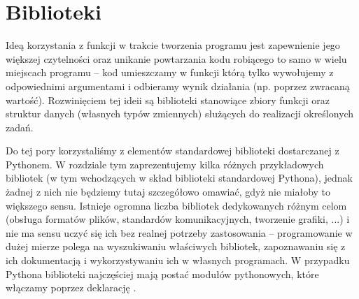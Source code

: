 % 
% 
% 
% 

\section{Biblioteki}

Ideą korzystania z funkcji w trakcie tworzenia programu jest zapewnienie jego większej czytelności oraz unikanie powtarzania kodu robiącego to samo w wielu miejscach programu – kod umieszczamy w funkcji którą tylko wywołujemy z odpowiednimi argumentami i odbieramy wynik działania (np. poprzez zwracaną wartość). Rozwinięciem tej ideii są biblioteki stanowiące zbiory funkcji oraz struktur danych (własnych typów zmiennych) służących do realizacji określonych zadań.



Do tej pory korzystaliśmy z elementów standardowej biblioteki dostarczanej z Pythonem. W rozdziale tym zaprezentujemy kilka różnych przykładowych bibliotek (w tym wchodzących w skład biblioteki standardowej Pythona), jednak żadnej z nich nie będziemy tutaj szczegółowo omawiać, gdyż nie miałoby to większego sensu. Istnieje ogromna liczba bibliotek dedykowanych różnym celom (obsługa formatów plików, standardów komunikacyjnych, tworzenie grafiki, ...) i nie ma sensu uczyć się ich bez realnej potrzeby zastosowania – programowanie w dużej mierze polega na wyszukiwaniu właściwych bibliotek, zapoznawaniu się z ich dokumentacją i wykorzystywaniu ich w własnych programach. W przypadku Pythona biblioteki najczęściej mają postać modułów pythonowych, które włączamy poprzez deklarację .

